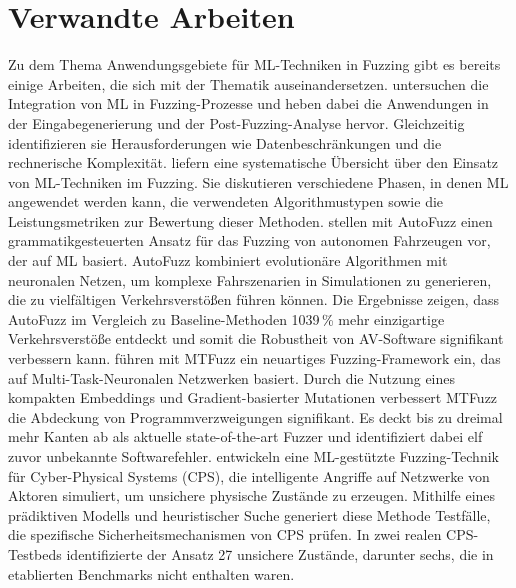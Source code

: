 
\section{Verwandte Arbeiten}\label{sec:related-work}
Zu dem Thema Anwendungsgebiete für ML-Techniken in Fuzzing gibt es bereits einige Arbeiten, die sich mit der Thematik auseinandersetzen.
\citet{saavedra_review_2019} untersuchen die Integration von ML in Fuzzing-Prozesse und heben dabei die Anwendungen in der
Eingabegenerierung und der Post-Fuzzing-Analyse hervor.
Gleichzeitig identifizieren sie Herausforderungen wie Datenbeschränkungen und die rechnerische Komplexität.
\citet{wang_systematic_2020} liefern eine systematische Übersicht über den Einsatz von ML-Techniken im Fuzzing.
Sie diskutieren verschiedene Phasen, in denen ML angewendet werden kann, die verwendeten Algorithmustypen sowie die
Leistungsmetriken zur Bewertung dieser Methoden.
\citet{zhong_neural_2022} stellen mit AutoFuzz einen grammatikgesteuerten Ansatz für das Fuzzing von autonomen Fahrzeugen
vor, der auf ML basiert.
AutoFuzz kombiniert evolutionäre Algorithmen mit neuronalen Netzen, um komplexe Fahrszenarien in Simulationen zu generieren,
die zu vielfältigen Verkehrsverstößen führen können.
Die Ergebnisse zeigen, dass AutoFuzz im Vergleich zu Baseline-Methoden \num{10}\text{--}\num{39}\,\unit{\percent}
mehr einzigartige Verkehrsverstöße
entdeckt und somit die Robustheit von AV-Software signifikant verbessern kann.
\citet{she_mtfuzz_2020} führen mit MTFuzz ein neuartiges Fuzzing-Framework ein, das auf Multi-Task-Neuronalen Netzwerken basiert.
Durch die Nutzung eines kompakten Embeddings und Gradient-basierter Mutationen verbessert MTFuzz die Abdeckung von
Programmverzweigungen signifikant.
Es deckt bis zu dreimal mehr Kanten ab als aktuelle state-of-the-art Fuzzer und identifiziert dabei elf zuvor unbekannte
Softwarefehler.
\citet{chen_learning-guided_2019} entwickeln eine ML-gestützte Fuzzing-Technik für Cyber-Physical Systems (CPS), die intelligente
Angriffe auf Netzwerke von Aktoren simuliert, um unsichere physische Zustände zu erzeugen.
Mithilfe eines prädiktiven Modells und heuristischer Suche generiert diese Methode Testfälle, die spezifische
Sicherheitsmechanismen von CPS prüfen.
In zwei realen CPS-Testbeds identifizierte der Ansatz 27 unsichere Zustände, darunter sechs, die in etablierten Benchmarks
nicht enthalten waren.